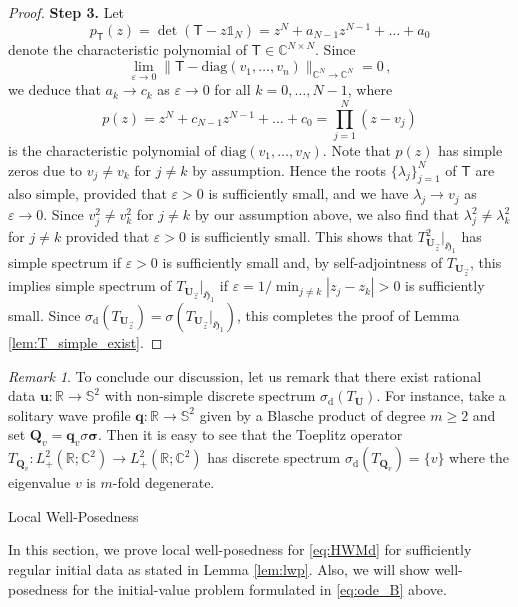 \documentclass[11pt,reqno]{amsart}
\makeatletter
\theoremstyle{definition}
\theoremstyle{remark}
\theoremstyle{remark}
\newtheorem*{remark*}{Remark}
\numberwithin{equation}{section}
\newcommand{\Hfr}{\mathfrak{H}}
\newcommand{\C}{\mathbb{C}}
\newcommand{\R}{\mathbb{R}}
\newcommand{\Ss}{\mathbb{S}}
\newcommand{\Qv}{\mathbf{Q}}
\newcommand{\qv}{\mathbf{q}}
\newcommand{\eps}{\varepsilon}
\newcommand{\uu}{\mathbf{u}}
\newcommand{\Ub}{\mathbf{U}}
\def\section{\@startsection{section}{1}%
  \z@{1.5\linespacing\@plus\linespacing}{.5\linespacing}%
  {\normalfont\bfseries\large\centering}}
\makeatother
\begin{document}
\begin{appendix}
\begin{proof}
\medskip
\textbf{Step 3.} Let 
$$
p_{\mathsf{T}}(z)= \det(\mathsf{T}-z \mathds{1}_N) = z^N + a_{N-1} z^{N-1} + \ldots + a_0 
$$ 
denote the characteristic polynomial of $\mathsf{T} \in \C^{N \times N}$. Since 
$$
\lim_{\eps \to 0} \| \mathsf{T} - \mathrm{diag}(v_1, \ldots, v_n) \|_{\C^N \to \C^N} = 0 \, ,
$$
we deduce that $a_{k} \to c_k$ as $\eps \to 0$ for all $k=0, \ldots, N-1$, where
$$
p(z) = z^N + c_{N-1} z^{N-1} + \ldots + c_0 = \prod_{j=1}^N (z-v_j)
$$
is the characteristic polynomial of $\mathrm{diag}(v_1, \ldots, v_N)$. Note that $p(z)$  has simple zeros due to $v_j \neq v_k$ for $j \neq k$ by assumption. Hence the roots $\{ \lambda_j \}_{j=1}^N$ of $\mathsf{T}$ are also simple, provided that $\eps > 0$ is sufficiently small, and we have $\lambda_j \to v_j$ as $\eps \to 0$. Since $v_j^2 \neq v_k^2$ for $j \neq k$ by our assumption above, we also find that $\lambda_j^2 \neq \lambda_k^2$ for $j \neq k$ provided that $\eps > 0$ is sufficiently small. This shows that $T_{\Ub_{\vec{z}}}^2 |_{\Hfr_1}$ has simple spectrum if $\eps > 0$ is sufficiently small and, by self-adjointness of $T_{\Ub_{\vec{z}}}$, this implies simple spectrum of $T_{\Ub_{\vec{z}}} |_{\Hfr_1}$ if $\eps=1/\min_{j \neq k}|z_j-z_k| >0$ is sufficiently small. Since $\sigma_{\mathrm{d}}(T_{\Ub_{\vec{z}}}) = \sigma (T_{\Ub_{\vec{z}}}|_{\Hfr_1})$, this completes the proof of Lemma \ref{lem:T_simple_exist}.
\end{proof}

\begin{remark*}
To conclude our discussion, let us remark that there exist rational data $\uu : \R \to \Ss^2$ with non-simple discrete spectrum $\sigma_{\mathrm{d}}(T_{\Ub})$. For instance, take a solitary wave profile $\qv : \R \to \Ss^2$ given by a Blasche product of degree $m \geq 2$ and set $\Qv_v = \qv_v \sigma \bm{\sigma}$. Then it is easy to see that the Toeplitz operator $T_{\Qv_v} : L^2_+(\R; \C^2) \to L^2_+(\R; \C^2)$ has discrete spectrum $\sigma_{\mathrm{d}}(T_{\Qv_v}) = \{ v \}$ where the eigenvalue $v$ is $m$-fold degenerate. 
\end{remark*}
\section{Local Well-Posedness} 
\label{app:LWP}

In this section, we prove local well-posedness for \eqref{eq:HWMd} for sufficiently regular initial data as stated in Lemma \ref{lem:lwp}. Also, we will show well-posedness for the initial-value problem formulated in \eqref{eq:ode_B} above.


\end{appendix}
\end{document}

